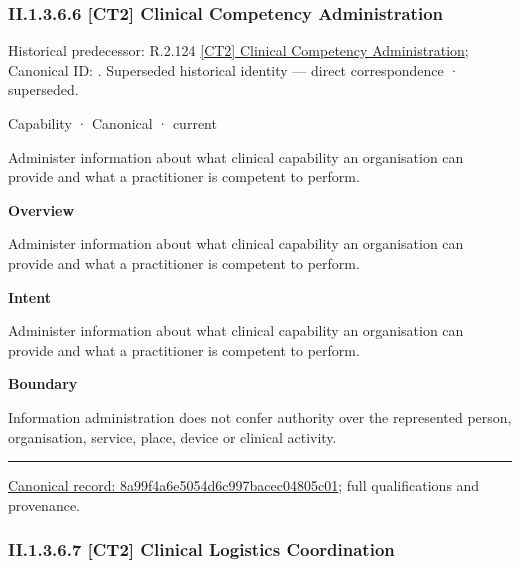 \subsubsection*{II.1.3.6.6 [CT2] Clinical Competency Administration}
\label{navigation:II.1.3.6.6}

{\small Historical predecessor: R.2.124 \hyperref[element:8a4b918e1c9d47bb99daf2b42008ab39]{[CT2] Clinical Competency Administration}; Canonical ID: \texttt{}. Superseded historical identity — direct correspondence · superseded.}\par
\label{element:8a99f4a6e5054d6c997bacec04805c01}
{\small Capability · Canonical · current}\par

Administer information about what clinical capability an organisation can provide and what a practitioner is competent to perform.



\textbf{Overview}



Administer information about what clinical capability an organisation can provide and what a practitioner is competent to perform.



\textbf{Intent}



Administer information about what clinical capability an organisation can provide and what a practitioner is competent to perform.



\textbf{Boundary}



Information administration does not confer authority over the represented person, organisation, service, place, device or clinical activity.



\medskip\hrule\medskip

{\footnotesize \href{../../../../../../../continuum/strategy/capability/8a99f4a6e5054d6c997bacec04805c01.md}{Canonical record: 8a99f4a6e5054d6c997bacec04805c01}; full qualifications and provenance.}\par
\subsubsection*{II.1.3.6.7 [CT2] Clinical Logistics Coordination}
\label{navigation:II.1.3.6.7}

